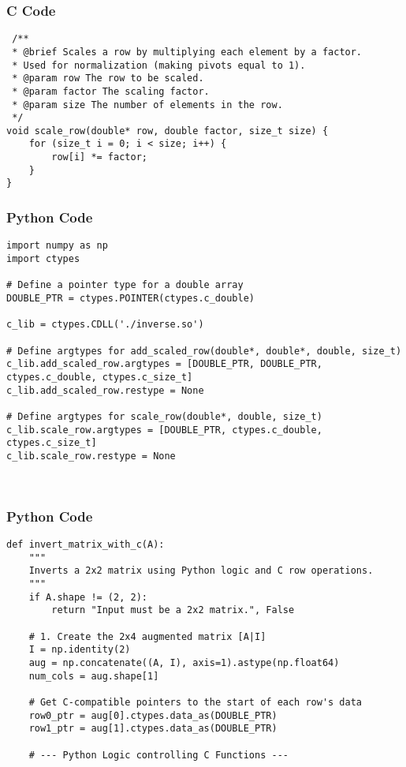 \documentclass{beamer}
\begin{document}
\begin{frame}[fragile]
    \frametitle{C Code}
    \begin{lstlisting}
 /**
 * @brief Scales a row by multiplying each element by a factor.
 * Used for normalization (making pivots equal to 1).
 * @param row The row to be scaled.
 * @param factor The scaling factor.
 * @param size The number of elements in the row.
 */
void scale_row(double* row, double factor, size_t size) {
    for (size_t i = 0; i < size; i++) {
        row[i] *= factor;
    }
}
    \end{lstlisting}
\end{frame}



\begin{frame}[fragile]
    \frametitle{Python Code}
    \begin{lstlisting}
import numpy as np
import ctypes

# Define a pointer type for a double array
DOUBLE_PTR = ctypes.POINTER(ctypes.c_double)

c_lib = ctypes.CDLL('./inverse.so')

# Define argtypes for add_scaled_row(double*, double*, double, size_t)
c_lib.add_scaled_row.argtypes = [DOUBLE_PTR, DOUBLE_PTR, ctypes.c_double, ctypes.c_size_t]
c_lib.add_scaled_row.restype = None

# Define argtypes for scale_row(double*, double, size_t)
c_lib.scale_row.argtypes = [DOUBLE_PTR, ctypes.c_double, ctypes.c_size_t]
c_lib.scale_row.restype = None



    \end{lstlisting}
\end{frame}

\begin{frame}[fragile]
    \frametitle{Python Code}
    \begin{lstlisting}
def invert_matrix_with_c(A):
    """
    Inverts a 2x2 matrix using Python logic and C row operations.
    """
    if A.shape != (2, 2):
        return "Input must be a 2x2 matrix.", False
    
    # 1. Create the 2x4 augmented matrix [A|I]
    I = np.identity(2)
    aug = np.concatenate((A, I), axis=1).astype(np.float64)
    num_cols = aug.shape[1]

    # Get C-compatible pointers to the start of each row's data
    row0_ptr = aug[0].ctypes.data_as(DOUBLE_PTR)
    row1_ptr = aug[1].ctypes.data_as(DOUBLE_PTR)

    # --- Python Logic controlling C Functions ---
    
    
    \end{lstlisting}
\end{frame}
\end{document}

